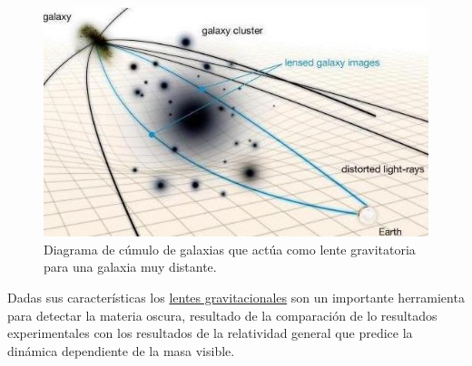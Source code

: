\begin{figure}[htbp]
\centering
\includegraphics[width=.6\textwidth]{Cap1/imagenes/lentes.jpg}
\caption[Diagrama de cúmulo de galaxias que actúa como lente gravitatoria para una galaxia muy distante.]{Diagrama de cúmulo de galaxias que actúa como lente gravitatoria para una galaxia muy distante.\footnotemark}
\label{lentes}
\end{figure}



Dadas sus características los \href{https://curiosoando.com/introduccion-a-las-lentes-gravitacionales}{lentes gravitacionales} son un importante herramienta para detectar la materia oscura, resultado de la comparación de lo resultados experimentales con los resultados de la relatividad general que predice la dinámica dependiente de la masa visible.


